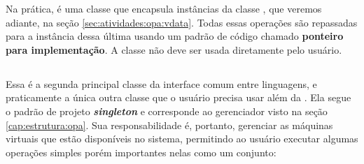   
  Na prática, \VObj{} é uma classe que encapsula instâncias da classe \VData{}, que veremos
  adiante, na seção \ref{sec:atividades:opa:vdata}. Todas essas operações são repassadas
  para a instância dessa última usando um padrão de código chamado \textbf{ponteiro para
  implementação}\footnotemark{}. A classe \VData{} não deve ser usada diretamente pelo
  usuário.
  
  
  \subsection{\SMgr{}}
  \label{sec:atividades:opa:smgr}
  Essa é a segunda principal classe da interface comum entre linguagens, e praticamente a
  única outra classe que o usuário precisa usar além da \VObj{}. Ela segue o padrão de projeto
  \textbf{\textit{singleton}}\footnotemark{} e corresponde ao gerenciador visto na seção
  \ref{cap:estrutura:opa}. Sua responsabilidade é, portanto, gerenciar as máquinas virtuais
  que estão disponíveis no sistema, permitindo ao usuário executar algumas operações simples
  porém importantes nelas como um conjunto:

  
